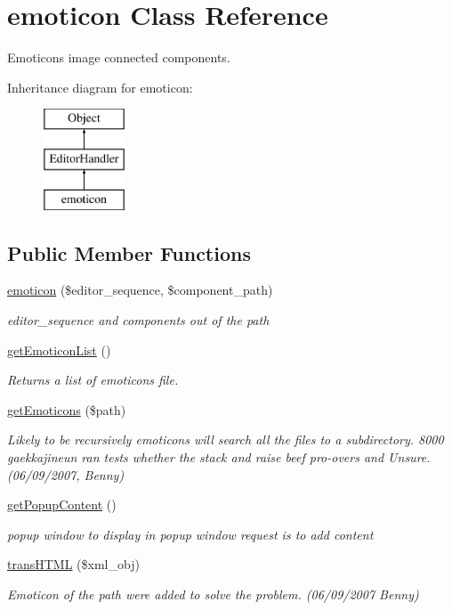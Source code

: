 \hypertarget{classemoticon}{}\section{emoticon Class Reference}
\label{classemoticon}


Emoticons image connected components.  


Inheritance diagram for emoticon\+:\begin{figure}[H]
\begin{center}
\leavevmode
\includegraphics[height=3.000000cm]{classemoticon}
\end{center}
\end{figure}
\subsection*{Public Member Functions}
\begin{DoxyCompactItemize}
\item 
\hyperlink{classemoticon_a8b042772a4d61cfcbdecbe945102a997}{emoticon} (\$editor\+\_\+sequence, \$component\+\_\+path)
\begin{DoxyCompactList}\small\item\em editor\+\_\+sequence and components out of the path \end{DoxyCompactList}\item 
\hyperlink{classemoticon_ac8b67c22af9daf48fb1d95f4fea2d07e}{get\+Emoticon\+List} ()
\begin{DoxyCompactList}\small\item\em Returns a list of emoticons file. \end{DoxyCompactList}\item 
\hyperlink{classemoticon_a95bdb6fcf406fc9882332a3b5f01542c}{get\+Emoticons} (\$path)
\begin{DoxyCompactList}\small\item\em Likely to be recursively emoticons will search all the files to a subdirectory. 8000 gaekkajineun ran tests whether the stack and raise beef pro-\/overs and Unsure. (06/09/2007, Benny) \end{DoxyCompactList}\item 
\hyperlink{classemoticon_afe901b31a28bed049ed8d553e996736d}{get\+Popup\+Content} ()
\begin{DoxyCompactList}\small\item\em popup window to display in popup window request is to add content \end{DoxyCompactList}\item 
\hyperlink{classemoticon_ae88c968e3b183a101c96d8013b4bf926}{trans\+H\+T\+ML} (\$xml\+\_\+obj)
\begin{DoxyCompactList}\small\item\em Emoticon of the path were added to solve the problem. (06/09/2007 Benny) \end{DoxyCompactList}\end{DoxyCompactItemize}
